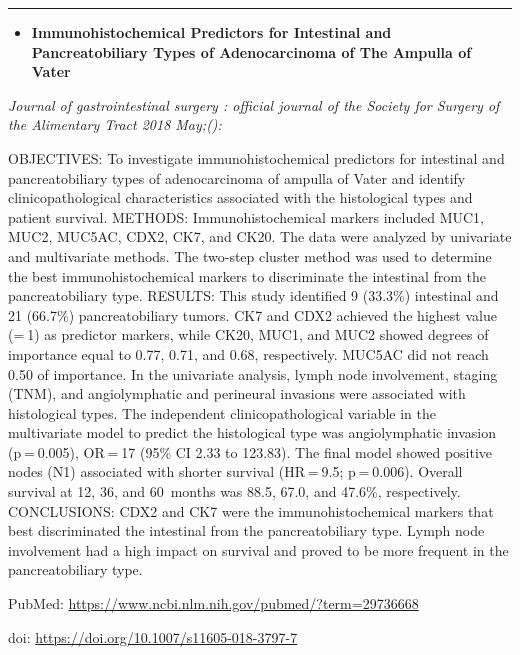\documentclass[]{article}
\providecommand{\tightlist}{%
  \setlength{\itemsep}{0pt}\setlength{\parskip}{0pt}}
\begin{document}
{}

\begin{center}\rule{0.5\linewidth}{\linethickness}\end{center}

\begin{itemize}
\tightlist
\item
  \textbf{Immunohistochemical Predictors for Intestinal and
  Pancreatobiliary Types of Adenocarcinoma of The Ampulla of Vater}
\end{itemize}

\emph{Journal of gastrointestinal surgery : official journal of the
Society for Surgery of the Alimentary Tract 2018 May;():}

OBJECTIVES: To investigate immunohistochemical predictors for intestinal
and pancreatobiliary types of adenocarcinoma of ampulla of Vater and
identify clinicopathological characteristics associated with the
histological types and patient survival. METHODS: Immunohistochemical
markers included MUC1, MUC2, MUC5AC, CDX2, CK7, and CK20. The data were
analyzed by univariate and multivariate methods. The two-step cluster
method was used to determine the best immunohistochemical markers to
discriminate the intestinal from the pancreatobiliary type. RESULTS:
This study identified 9 (33.3\%) intestinal and 21 (66.7\%)
pancreatobiliary tumors. CK7 and CDX2 achieved the highest value (= 1)
as predictor markers, while CK20, MUC1, and MUC2 showed degrees of
importance equal to 0.77, 0.71, and 0.68, respectively. MUC5AC did not
reach 0.50 of importance. In the univariate analysis, lymph node
involvement, staging (TNM), and angiolymphatic and perineural invasions
were associated with histological types. The independent
clinicopathological variable in the multivariate model to predict the
histological type was angiolymphatic invasion (p = 0.005), OR = 17 (95\%
CI 2.33 to 123.83). The final model showed positive nodes (N1)
associated with shorter survival (HR = 9.5; p = 0.006). Overall survival
at 12, 36, and 60~months was 88.5, 67.0, and 47.6\%, respectively.
CONCLUSIONS: CDX2 and CK7 were the immunohistochemical markers that best
discriminated the intestinal from the pancreatobiliary type. Lymph node
involvement had a high impact on survival and proved to be more frequent
in the pancreatobiliary type.

PubMed: \url{https://www.ncbi.nlm.nih.gov/pubmed/?term=29736668}

doi: \url{https://doi.org/10.1007/s11605-018-3797-7}

{}
\end{document}
